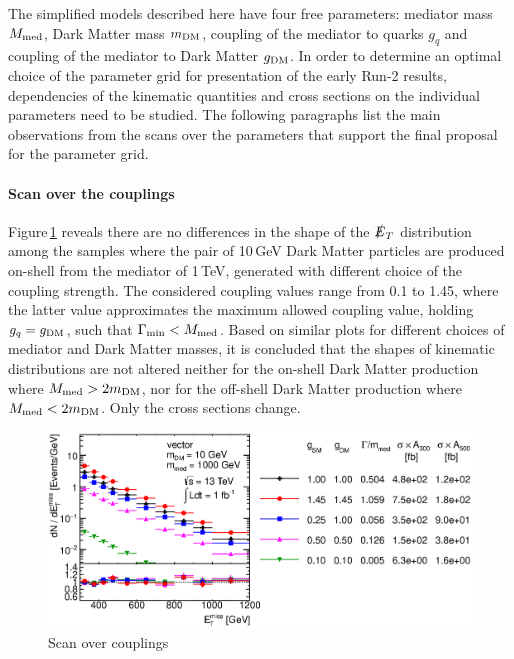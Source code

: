 The simplified models described here have four free parameters: mediator mass $M_{\rm{med}}$, Dark Matter mass $m_{\rm{DM}}$, coupling of the mediator to quarks $g_q$ and coupling of the mediator to Dark Matter $g_{\rm{DM}}$. In order to determine an optimal choice of the parameter grid for presentation of the early Run-2 results, dependencies of the kinematic quantities and cross sections on the individual parameters need to be studied. The following paragraphs list the main observations from the scans over the parameters that support the final proposal for the parameter grid.


\paragraph{Scan over the couplings}

Figure\,\ref{fig:monojet_scan_V_g} reveals there are no differences in the shape of the $\slashed{E}_T$ distribution among the samples where the pair of 10\,GeV Dark Matter particles are produced on-shell from the mediator of 1\,TeV, generated with different choice of the coupling strength. The considered coupling values range from 0.1 to 1.45, where the latter value approximates the maximum allowed coupling value, holding $g_q=g_{\rm{DM}}$, such that $\Gamma_{\rm{min}} < M_{\rm{med}}$.
Based on similar plots for different choices of mediator and Dark Matter masses, it is concluded that the shapes of kinematic distributions are not altered neither for the on-shell Dark Matter production where $M_{\rm{med}}>2m_{\rm{DM}}$, nor for the off-shell Dark Matter production where $M_{\rm{med}}<2m_{\rm{DM}}$. Only the cross sections change.
\begin{figure}
\centering
\includegraphics[width=0.9\linewidth]{figures/monojet/scan_g_V_10_1000.eps}
\caption{Scan over couplings}
\label{fig:monojet_scan_V_g}
\end{figure}


